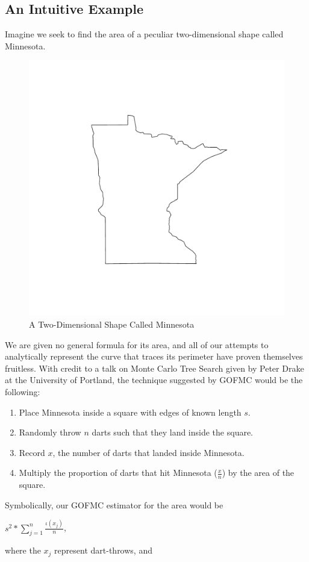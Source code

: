 \documentclass[12pt,twoside]{reedthesis}
\begin{document}
		\subsection*{An Intuitive Example}
		Imagine we seek to find the area of a peculiar two-dimensional shape called Minnesota. 
		\begin{figure}[h]
	       	\centering
	    	\includegraphics[clip=true, viewport=.3in 1in 6in 6in,scale=0.5]{mn}
	     	\caption{A Two-Dimensional Shape Called Minnesota}
	 	\label{subd}
		\end{figure}	
		We are given no general formula for its area, and all of our attempts to analytically represent the curve that traces its perimeter have proven themselves fruitless. With credit to a talk on Monte Carlo Tree Search given by Peter Drake at the University of Portland, the technique suggested by GOFMC would be the following:
			\begin{enumerate}
				\item Place Minnesota inside a square with edges of known length $s$.
				\item Randomly throw $n$ darts such that they land inside the square. 
				\item Record $x$, the number of darts that landed inside Minnesota.
				\item Multiply the proportion of darts that hit Minnesota ($\frac{x}{n}$) by the area of the square.
			\end{enumerate}
			Symbolically, our GOFMC estimator for the area would be
			\begin{center}
				${s^2} * \displaystyle\sum_{j=1}^{n}\frac{\iota(x_j)}{n}$,
			\end{center}
			where the $x_j$ represent dart-throws, and 
			
\end{document}
